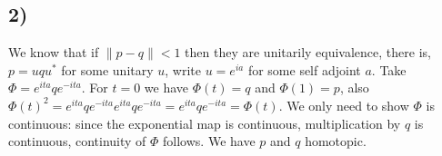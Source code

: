 \documentclass{article}
\begin{document}
\subsection*{2)}

We know that if $\|p-q\|<1$ then they are unitarily equivalence, there is, $p=uqu^\ast$ for 
some unitary $u$, write $u=e^{ia}$ for some self adjoint $a$. Take $\Phi=e^{ita}qe^{-ita}$.
For $t=0$ we have $\Phi(t)=q$ and $\Phi(1)=p$, also $\Phi(t)^2=e^{ita}qe^{-ita}e^{ita}qe^{-ita}=
e^{ita}qe^{-ita}=\Phi(t)$. We only need to show $\Phi$ is continuous: since the exponential
map is continuous, multiplication by $q$ is continuous, continuity of $\Phi$ follows. 
We have $p$ and $q$ homotopic.
\end{document}
